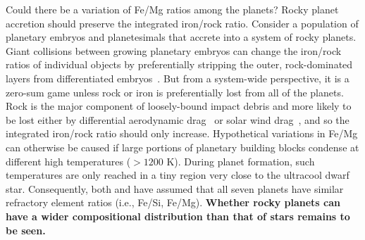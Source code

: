 \documentclass[twocolumn]{aastex63}
\begin{document}
Could there be a variation of Fe/Mg ratios among the planets?
Rocky planet accretion should preserve the integrated iron/rock ratio. Consider a population of planetary embryos and planetesimals that accrete into a system of rocky planets. Giant collisions between growing planetary embryos can change the iron/rock ratios of individual objects by preferentially stripping the outer, rock-dominated layers from differentiated embryos~\citep[e.g.][]{benz88,marcus10,asphaug14}. But from a system-wide perspective, it is a zero-sum game unless rock or iron is preferentially lost from all of the planets. Rock is the major component of loosely-bound impact debris and more likely to be lost either by differential aerodynamic drag~\citep{weidenschilling77} or solar wind drag~\citep{spalding20}, and so the integrated iron/rock ratio should only increase.
Hypothetical variations in Fe/Mg can otherwise be caused if large portions of planetary building blocks condense at different high temperatures (${>} 1200$ K). During planet formation, such temperatures are only reached in a tiny region very close to the ultracool dwarf star. Consequently, both \citet{Unterborn2018a} and \citet{Dorn2018} have assumed that all seven planets have similar refractory element ratios (i.e., Fe/Si, Fe/Mg). \textbf{Whether rocky planets can have a wider compositional distribution than that of stars remains to be seen.}


\end{document}
